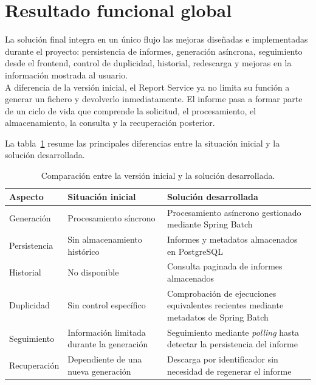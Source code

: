 \documentclass[11pt,a4paper,titlepage,oneside]{report}
\newcommand{\tfgtablestyle}{%
  \small
  \setlength{\tabcolsep}{4pt}%
  \renewcommand{\arraystretch}{1.15}%
  \rowcolors{2}{udcgray!08}{white}%
}
\begin{document}
\section{Resultado funcional global}

La solución final integra en un único flujo las mejoras diseñadas e
implementadas durante el proyecto: persistencia de informes, generación
asíncrona, seguimiento desde el frontend, control de duplicidad, historial,
redescarga y mejoras en la información mostrada al usuario. \\

A diferencia de la versión inicial, el Report Service ya no limita su función a
generar un fichero y devolverlo inmediatamente. El informe pasa a formar parte
de un ciclo de vida que comprende la solicitud, el procesamiento, el
almacenamiento, la consulta y la recuperación posterior.

La tabla~\ref{tab:comparativa-solucion} resume las principales diferencias
entre la situación inicial y la solución desarrollada.

\begin{table}[H]
  \centering
  \tfgtablestyle
  \caption{Comparación entre la versión inicial y la solución desarrollada.}
  \label{tab:comparativa-solucion}

  \begin{tabularx}{0.97\textwidth}{@{}p{}XX@{}}

    \toprule
    \rowcolor{udcpink!20}

    \textbf{Aspecto} &
    \textbf{Situación inicial} &
    \textbf{Solución desarrollada} \\

    \midrule

    Generación &
    Procesamiento síncrono &
    Procesamiento asíncrono gestionado mediante Spring Batch \\

    Persistencia &
    Sin almacenamiento histórico &
    Informes y metadatos almacenados en PostgreSQL \\

    Historial &
    No disponible &
    Consulta paginada de informes almacenados \\

    Duplicidad &
    Sin control específico &
    Comprobación de ejecuciones equivalentes recientes mediante metadatos de
    Spring Batch \\

    Seguimiento &
    Información limitada durante la generación &
    Seguimiento mediante \textit{polling} hasta detectar la persistencia del
    informe \\

    Recuperación &
    Dependiente de una nueva generación &
    Descarga por identificador sin necesidad de regenerar el informe \\

    \bottomrule
  \end{tabularx}

\end{table}
\end{document}
